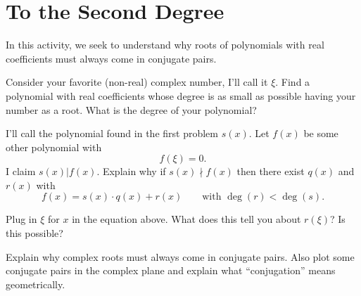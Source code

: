 \newpage
\section{To the Second Degree}\label{deg2Ext}

In this activity, we seek to understand why roots of polynomials with
real coefficients must always come in conjugate pairs.

\begin{prob}
Consider your favorite (non-real) complex number, I'll call it
$\xi$. Find a polynomial with real coefficients whose degree is as
small as possible having your number as a root. What is the degree
of your polynomial?
\end{prob}


\begin{prob}
I'll call the polynomial found in the first problem $s(x)$. Let $f(x)$
be some other polynomial with
\[
f(\xi) = 0.
\]
I claim $s(x) | f(x)$. Explain why if $s(x)\nmid f(x)$ then there exist $q(x)$ and $r(x)$ with
\[
f(x) = s(x) \cdot q(x) + r(x)\qquad\text{with }\deg(r) <\deg(s).
\]
\end{prob}

\begin{prob}
Plug in $\xi$ for $x$ in the equation above. What does this tell you
about $r(\xi)$? Is this possible?
\end{prob}

\begin{prob}
Explain why complex roots must always come in conjugate pairs. Also
plot some conjugate pairs in the complex plane and explain what
``conjugation'' means geometrically.
\end{prob}
